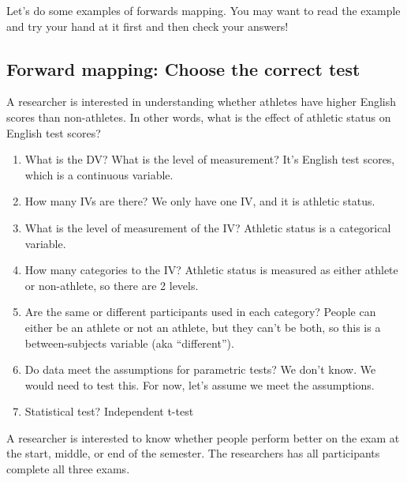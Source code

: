 \documentclass[
]{book}
\begin{document}
Let's do some examples of forwards mapping. You may want to read the example and try your hand at it first and then check your answers!

\hypertarget{forward-mapping-choose-the-correct-test}{%
\subsection{Forward mapping: Choose the correct test}\label{forward-mapping-choose-the-correct-test}}

A researcher is interested in understanding whether athletes have higher English scores than non-athletes. In other words, what is the effect of athletic status on English test scores?

\begin{enumerate}
\def\labelenumi{\arabic{enumi}.}
\item
  What is the DV? What is the level of measurement? It's English test scores, which is a continuous variable.
\item
  How many IVs are there? We only have one IV, and it is athletic status.
\item
  What is the level of measurement of the IV? Athletic status is a categorical variable.
\item
  How many categories to the IV? Athletic status is measured as either athlete or non-athlete, so there are 2 levels.
\item
  Are the same or different participants used in each category? People can either be an athlete or not an athlete, but they can't be both, so this is a between-subjects variable (aka ``different'').
\item
  Do data meet the assumptions for parametric tests? We don't know. We would need to test this. For now, let's assume we meet the assumptions.
\item
  Statistical test? Independent t-test
\end{enumerate}

A researcher is interested to know whether people perform better on the exam at the start, middle, or end of the semester. The researchers has all participants complete all three exams.
\end{document}
